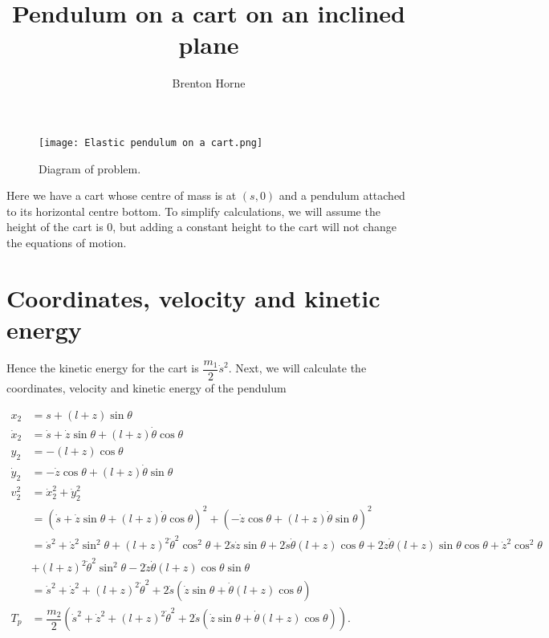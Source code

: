 \documentclass[12pt,a4paper,portrait]{article}
\date{}
\title{Pendulum on a cart on an inclined plane}
\author{Brenton Horne}
\begin{document}
	\maketitle
	\begin{figure}[H]
		\texttt{[image: Elastic pendulum on a cart.png]}
		\caption{Diagram of problem.}\label{fig1}
	\end{figure}
	
	Here we have a cart whose centre of mass is at $(s, 0)$ and a pendulum attached to its horizontal centre bottom. To simplify calculations, we will assume the height of the cart is 0, but adding a constant height to the cart will not change the equations of motion.
	
	\tableofcontents
	\section{Coordinates, velocity and kinetic energy}
	Hence the kinetic energy for the cart is $\dfrac{m_1}{2}\dot{s}^2$. Next, we will calculate the coordinates, velocity and kinetic energy of the pendulum
	
	\begin{align*}
		x_2 &= s + (l+z)\sin{\theta} \\
		\dot{x}_2 &= \dot{s} + \dot{z}\sin{\theta} + (l+z)\dot{\theta}\cos{\theta}\\
		y_2 &= -(l+z)\cos{\theta} \\
		\dot{y}_2 &= -\dot{z}\cos{\theta} + (l+z)\dot{\theta}\sin{\theta} \\
		v_2^2 &= \dot{x}_2^2 + \dot{y}_2^2 \\
		&= (\dot{s} + \dot{z}\sin{\theta} + (l+z)\dot{\theta}\cos{\theta})^2 + (-\dot{z}\cos{\theta} + (l+z)\dot{\theta}\sin{\theta})^2 \\
		&= \dot{s}^2 + \dot{z}^2 \sin^2{\theta} + (l+z)^2\dot{\theta}^2\cos^2{\theta} + 2\dot{s}\dot{z}\sin{\theta} + 2\dot{s}\dot{\theta}(l+z)\cos{\theta} + 2\dot{z}\dot{\theta}(l+z)\sin{\theta}\cos{\theta} + \dot{z}^2\cos^2{\theta} \\
		&+ (l+z)^2\dot{\theta}^2\sin^2{\theta} - 2\dot{z}\dot{\theta}(l+z)\cos{\theta}\sin{\theta}\\
		&= \dot{s}^2 + \dot{z}^2 + (l+z)^2\dot{\theta}^2 + 2\dot{s}(\dot{z}\sin{\theta} + \dot{\theta}(l+z)\cos{\theta})\\
		T_p &= \dfrac{m_2}{2} \left(\dot{s}^2 + \dot{z}^2 + (l+z)^2\dot{\theta}^2 + 2\dot{s}(\dot{z}\sin{\theta} + \dot{\theta}(l+z)\cos{\theta})\right).
	\end{align*}
	
\end{document}
